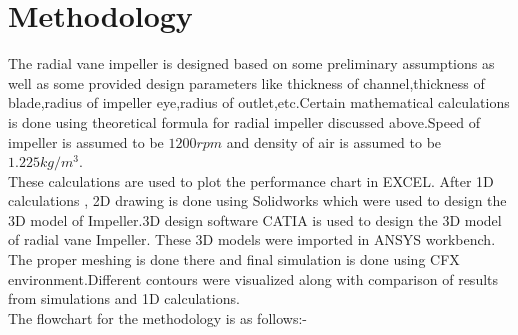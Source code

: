 \documentclass[11pt]{article}
\begin{document}
 \section{Methodology}
 The radial vane impeller is designed based on some preliminary assumptions as well as some provided design parameters like thickness of channel,thickness of blade,radius of impeller eye,radius of outlet,etc.Certain mathematical calculations is done using theoretical formula for radial impeller discussed above.Speed of impeller is assumed to be $1200 rpm$ and density of air is assumed to be $1.225 kg/m^3$.\\
 These calculations are used to plot the performance chart in EXCEL.
 After 1D calculations , 2D drawing is done using Solidworks which were used to design the 3D model of Impeller.3D design software  CATIA is used to design the 3D model of radial vane Impeller. These 3D models were imported in ANSYS workbench. The proper meshing is done there and final simulation is done using CFX environment.Different contours were visualized along with comparison of results from simulations and 1D calculations.\\
 The flowchart for the methodology is as follows:-\\
 \begin{center}
\end{center}
\end{document}
